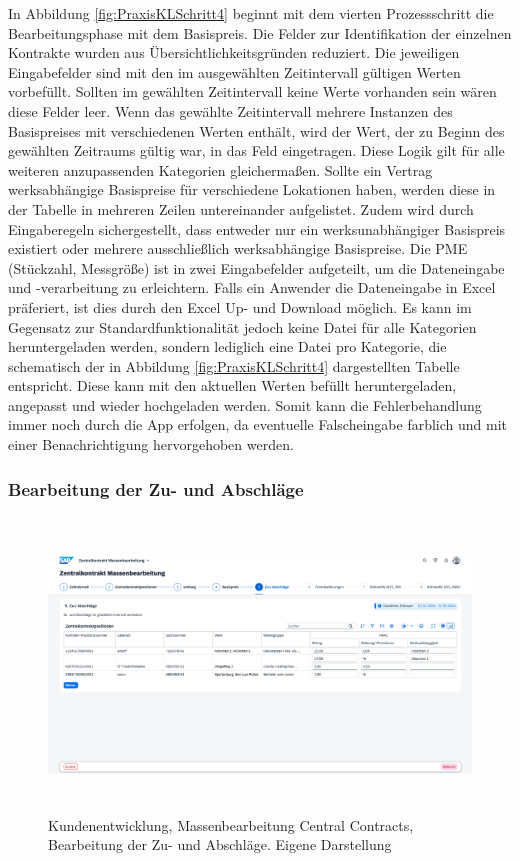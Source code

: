 In Abbildung \ref{fig:PraxisKLSchritt4} beginnt mit dem vierten Prozessschritt die Bearbeitungsphase mit dem Basispreis. Die Felder zur Identifikation der einzelnen Kontrakte wurden aus Übersichtlichkeitsgründen reduziert. Die jeweiligen Eingabefelder sind mit den im ausgewählten Zeitintervall gültigen Werten vorbefüllt. Sollten im gewählten Zeitintervall keine Werte vorhanden sein wären diese Felder leer. Wenn das gewählte Zeitintervall mehrere Instanzen des Basispreises mit verschiedenen Werten enthält, wird der Wert, der zu Beginn des gewählten Zeitraums gültig war, in das Feld eingetragen. Diese Logik gilt für alle weiteren anzupassenden Kategorien gleicherma\ss en. Sollte ein Vertrag werksabhängige Basispreise für verschiedene Lokationen haben, werden diese in der Tabelle in mehreren Zeilen untereinander aufgelistet. Zudem wird durch Eingaberegeln sichergestellt, dass entweder nur ein werksunabhängiger Basispreis existiert oder mehrere ausschlie\ss lich werksabhängige Basispreise. Die PME (Stückzahl, Messgrö\ss e) ist in zwei Eingabefelder aufgeteilt, um die Dateneingabe und -verarbeitung zu erleichtern. Falls ein Anwender die Dateneingabe in Excel präferiert, ist dies durch den Excel Up- und Download möglich. Es kann im Gegensatz zur Standardfunktionalität jedoch keine Datei für alle Kategorien heruntergeladen werden, sondern lediglich eine Datei pro Kategorie, die schematisch der in Abbildung \ref{fig:PraxisKLSchritt4} dargestellten Tabelle entspricht. Diese kann mit den aktuellen Werten befüllt heruntergeladen, angepasst und wieder hochgeladen werden. Somit kann die Fehlerbehandlung immer noch durch die App erfolgen, da eventuelle Falscheingabe farblich und mit einer Benachrichtigung hervorgehoben werden.

\subsubsection{Bearbeitung der Zu- und Abschläge}

\begin{figure}[H]
    \centering
    \includegraphics[height=7.78cm]{Bilder/Praxisteil-KL-Schritt-5.png}
    \caption[Kundenentwicklung, Massenbearbeitung Central Contracts, Bearbeitung der Zu- und Abschläge]{Kundenentwicklung, Massenbearbeitung Central Contracts, Bearbeitung der Zu- und Abschläge. Eigene Darstellung}
    \label{fig:PraxisKLSchritt5}
\end{figure}

